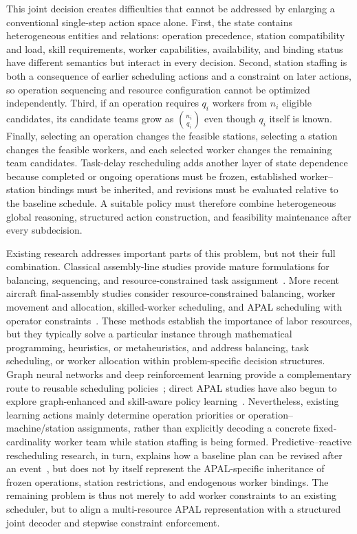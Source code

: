 This joint decision creates difficulties that cannot be addressed by enlarging a conventional single-step action space alone. First, the state contains heterogeneous entities and relations: operation precedence, station compatibility and load, skill requirements, worker capabilities, availability, and binding status have different semantics but interact in every decision. Second, station staffing is both a consequence of earlier scheduling actions and a constraint on later actions, so operation sequencing and resource configuration cannot be optimized independently. Third, if an operation requires $q_i$ workers from $n_i$ eligible candidates, its candidate teams grow as $\binom{n_i}{q_i}$ even though $q_i$ itself is known. Finally, selecting an operation changes the feasible stations, selecting a station changes the feasible workers, and each selected worker changes the remaining team candidates. Task-delay rescheduling adds another layer of state dependence because completed or ongoing operations must be frozen, established worker--station bindings must be inherited, and revisions must be evaluated relative to the baseline schedule. A suitable policy must therefore combine heterogeneous global reasoning, structured action construction, and feasibility maintenance after every subdecision.

Existing research addresses important parts of this problem, but not their full combination. Classical assembly-line studies provide mature formulations for balancing, sequencing, and resource-constrained task assignment~\cite{becker2006,boysen2007,battaia2013,boysen2009}. More recent aircraft final-assembly studies consider resource-constrained balancing, worker movement and allocation, skilled-worker scheduling, and APAL scheduling with operator constraints~\cite{bao2023afal,wang2024worker,liu2025afalworker,wen2025qlpso}. These methods establish the importance of labor resources, but they typically solve a particular instance through mathematical programming, heuristics, or metaheuristics, and address balancing, task scheduling, or worker allocation within problem-specific decision structures. Graph neural networks and deep reinforcement learning provide a complementary route to reusable scheduling policies~\cite{cappart2023,zhang2020,park2021,wang2024,panzer2022}; direct APAL studies have also begun to explore graph-enhanced and skill-aware policy learning~\cite{ai2025,wen2026ginppo}. Nevertheless, existing learning actions mainly determine operation priorities or operation--machine/station assignments, rather than explicitly decoding a concrete fixed-cardinality worker team while station staffing is being formed. Predictive--reactive rescheduling research, in turn, explains how a baseline plan can be revised after an event~\cite{vieira2003,moghaddam2022}, but does not by itself represent the APAL-specific inheritance of frozen operations, station restrictions, and endogenous worker bindings. The remaining problem is thus not merely to add worker constraints to an existing scheduler, but to align a multi-resource APAL representation with a structured joint decoder and stepwise constraint enforcement.


